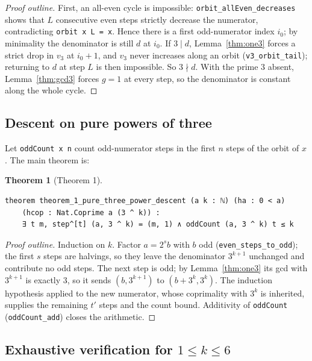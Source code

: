 \documentclass[11pt,a4paper]{article}
\newtheorem{theorem}{Theorem}[section]
\begin{document}
\begin{proof}[Proof outline]
First, an all-even cycle is impossible: \texttt{orbit\_allEven\_decreases} shows
that $L$ consecutive even steps strictly decrease the numerator, contradicting
\texttt{orbit x L = x}.  Hence there is a first odd-numerator index $i_{0}$; by
minimality the denominator is still $d$ at $i_{0}$.  If $3\mid d$, Lemma~\ref{thm:one3}
forces a strict drop in $v_{3}$ at $i_{0}+1$, and $v_{3}$ never increases along an
orbit (\texttt{v3\_orbit\_tail}); returning to $d$ at step $L$ is then impossible.
So $3\nmid d$.  With the prime $3$ absent, Lemma~\ref{thm:gcd3} forces $g=1$ at
every step, so the denominator is constant along the whole cycle.
\end{proof}

\subsection{Descent on pure powers of three}

Let \texttt{oddCount x n} count odd-numerator steps in the first $n$ steps of
the orbit of $x$.  The main theorem is:

\begin{theorem}[Theorem 1]
\label{thm:descent}
\leavevmode\par\vspace{0.3em}
\begin{lstlisting}
theorem theorem_1_pure_three_power_descent (a k : ℕ) (ha : 0 < a)
    (hcop : Nat.Coprime a (3 ^ k)) :
    ∃ t m, step^[t] (a, 3 ^ k) = (m, 1) ∧ oddCount (a, 3 ^ k) t ≤ k
\end{lstlisting}
\end{theorem}

\begin{proof}[Proof outline]
Induction on $k$.  Factor $a=2^{s}b$ with $b$ odd (\texttt{even\_steps\_to\_odd});
the first $s$ steps are halvings, so they leave the denominator $3^{k+1}$
unchanged and contribute no odd steps.  The next step is odd; by
Lemma~\ref{thm:one3} its gcd with $3^{k+1}$ is exactly $3$, so it sends
$(b,3^{k+1})$ to $(b+3^{k},3^{k})$.  The induction hypothesis applied to the new
numerator, whose coprimality with $3^{k}$ is inherited, supplies the remaining
$t'$ steps and the count bound.  Additivity of \texttt{oddCount}
(\texttt{oddCount\_add}) closes the arithmetic.
\end{proof}

\subsection{Exhaustive verification for \texorpdfstring{$1\le k\le 6$}{1 <= k <= 6}}
\end{document}
